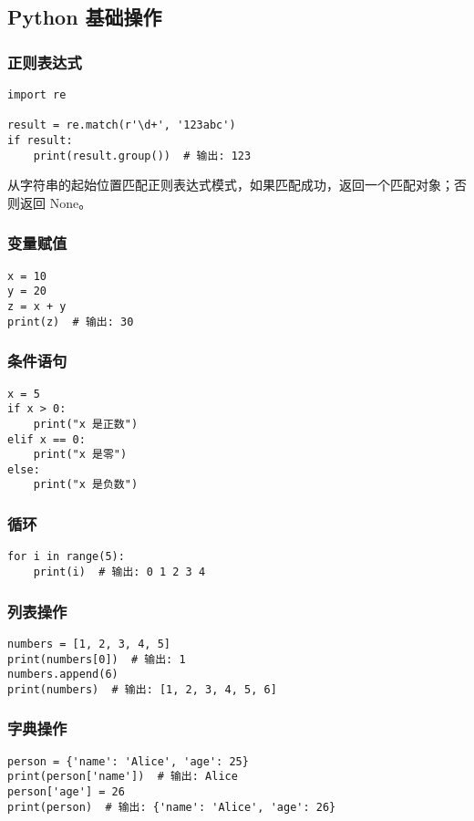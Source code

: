 \documentclass[a4paper, 12pt]{article}
\begin{document}
\subsection{Python 基础操作}
\subsubsection{正则表达式}
\begin{lstlisting}
import re

result = re.match(r'\d+', '123abc')
if result:
    print(result.group())  # 输出: 123
\end{lstlisting}
从字符串的起始位置匹配正则表达式模式，如果匹配成功，返回一个匹配对象；否则返回 None。
\subsubsection{变量赋值}
\begin{lstlisting}
x = 10
y = 20
z = x + y
print(z)  # 输出: 30
\end{lstlisting}

\subsubsection{条件语句}
\begin{lstlisting}
x = 5
if x > 0:
    print("x 是正数")
elif x == 0:
    print("x 是零")
else:
    print("x 是负数")
\end{lstlisting}

\subsubsection{循环}
\begin{lstlisting}
for i in range(5):
    print(i)  # 输出: 0 1 2 3 4
\end{lstlisting}

\subsubsection{列表操作}
\begin{lstlisting}
numbers = [1, 2, 3, 4, 5]
print(numbers[0])  # 输出: 1
numbers.append(6)
print(numbers)  # 输出: [1, 2, 3, 4, 5, 6]
\end{lstlisting}

\subsubsection{字典操作}
\begin{lstlisting}
person = {'name': 'Alice', 'age': 25}
print(person['name'])  # 输出: Alice
person['age'] = 26
print(person)  # 输出: {'name': 'Alice', 'age': 26}
\end{lstlisting}
\end{document}
